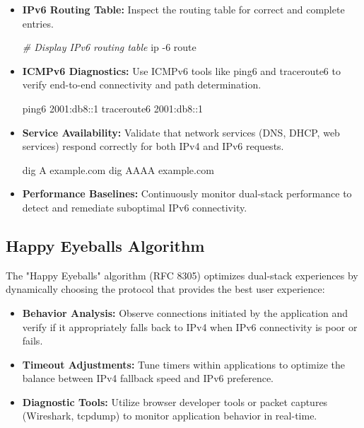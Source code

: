 \documentclass[
]{article}
\newenvironment{Shaded}{}{}
\newcommand{\AttributeTok}[1]{\textcolor[rgb]{0.49,0.56,0.16}{#1}}
\newcommand{\CommentTok}[1]{\textcolor[rgb]{0.38,0.63,0.69}{\textit{#1}}}
\newcommand{\ExtensionTok}[1]{#1}
\newcommand{\NormalTok}[1]{#1}
\providecommand{\tightlist}{%
  \setlength{\itemsep}{0pt}\setlength{\parskip}{0pt}}
\begin{document}
\begin{itemize}
\item
  \textbf{IPv6 Routing Table:} Inspect the routing table for correct and
  complete entries.

\begin{Shaded}
\begin{Highlighting}[]
\CommentTok{\# Display IPv6 routing table}
\ExtensionTok{ip} \AttributeTok{{-}6}\NormalTok{ route}
\end{Highlighting}
\end{Shaded}
\item
  \textbf{ICMPv6 Diagnostics:} Use ICMPv6 tools like ping6 and
  traceroute6 to verify end-to-end connectivity and path determination.

\begin{Shaded}
\begin{Highlighting}[]
\ExtensionTok{ping6}\NormalTok{ 2001:db8::1}
\ExtensionTok{traceroute6}\NormalTok{ 2001:db8::1}
\end{Highlighting}
\end{Shaded}
\item
  \textbf{Service Availability:} Validate that network services (DNS,
  DHCP, web services) respond correctly for both IPv4 and IPv6 requests.

\begin{Shaded}
\begin{Highlighting}[]
\ExtensionTok{dig}\NormalTok{ A example.com}
\ExtensionTok{dig}\NormalTok{ AAAA example.com}
\end{Highlighting}
\end{Shaded}
\item
  \textbf{Performance Baselines:} Continuously monitor dual-stack
  performance to detect and remediate suboptimal IPv6 connectivity.
\end{itemize}

\subsection{Happy Eyeballs Algorithm}\label{happy-eyeballs-algorithm}

The "Happy Eyeballs" algorithm (RFC 8305) optimizes dual-stack
experiences by dynamically choosing the protocol that provides the best
user experience:

\begin{itemize}
\tightlist
\item
  \textbf{Behavior Analysis:} Observe connections initiated by the
  application and verify if it appropriately falls back to IPv4 when
  IPv6 connectivity is poor or fails.
\item
  \textbf{Timeout Adjustments:} Tune timers within applications to
  optimize the balance between IPv4 fallback speed and IPv6 preference.
\item
  \textbf{Diagnostic Tools:} Utilize browser developer tools or packet
  captures (Wireshark, tcpdump) to monitor application behavior in
  real-time.
\end{itemize}
\end{document}
